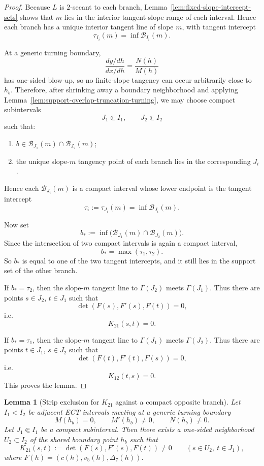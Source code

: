 \documentclass[11pt,a4paper]{amsart}
\theoremstyle{plain}
\newtheorem{lemma}[theorem]{Lemma}
\theoremstyle{definition}
\begin{document}
\begin{proof}
Because $L$ is $2$-secant to each branch, Lemma~\ref{lem:fixed-slope-intercept-sets}
shows that $m$ lies in the interior tangent-slope range of each interval.
Hence each branch has a unique interior tangent line of slope $m$, with tangent
intercept
\[
\tau_{I_i}(m)=\inf \mathcal B_{I_i}(m).
\]

At a generic turning boundary,
\[
\frac{dy/dh}{dx/dh}=\frac{N(h)}{M(h)}
\]
has one-sided blow-up, so no finite-slope tangency can occur arbitrarily close
to $h_b$. Therefore, after shrinking away a boundary neighborhood and applying
Lemma~\ref{lem:support-overlap-truncation-turning}, we may choose compact
subintervals
\[
J_1\Subset I_1,
\qquad
J_2\Subset I_2
\]
such that:
\begin{enumerate}
\item $b\in \mathcal B_{J_1}(m)\cap \mathcal B_{J_2}(m)$;
\item the unique slope-$m$ tangency point of each branch lies in the
corresponding $J_i$.
\end{enumerate}
Hence each $\mathcal B_{J_i}(m)$ is a compact interval whose lower endpoint
is the tangent intercept
\[
\tau_i:=\tau_{J_i}(m)=\inf \mathcal B_{J_i}(m).
\]

Now set
\[
b_*:=\inf\bigl(\mathcal B_{J_1}(m)\cap \mathcal B_{J_2}(m)\bigr).
\]
Since the intersection of two compact intervals is again a compact interval,
\[
b_*=\max(\tau_1,\tau_2).
\]
So $b_*$ is equal to one of the two tangent intercepts, and it still lies in
the support set of the other branch.

If $b_*=\tau_2$, then the slope-$m$ tangent line to $\Gamma(J_2)$ meets
$\Gamma(J_1)$. Thus there are points $s\in J_2$, $t\in J_1$ such that
\[
\det(F(s),F'(s),F(t))=0,
\]
i.e.
\[
K_{21}(s,t)=0.
\]

If $b_*=\tau_1$, then the slope-$m$ tangent line to $\Gamma(J_1)$ meets
$\Gamma(J_2)$. Thus there are points $t\in J_1$, $s\in J_2$ such that
\[
\det(F(t),F'(t),F(s))=0,
\]
i.e.
\[
K_{12}(t,s)=0.
\]
This proves the lemma.
\end{proof}

\begin{lemma}[Strip exclusion for $K_{21}$ against a compact opposite branch]
\label{lem:strip-exclusion-k21}
Let $I_1<I_2$ be adjacent ECT intervals meeting at a generic turning boundary
\[
M(h_b)=0,\qquad M'(h_b)\neq 0,\qquad N(h_b)\neq 0.
\]
Let $J_1\Subset I_1$ be a compact subinterval. Then there exists a one-sided
neighborhood $U_2\subset I_2$ of the shared boundary point $h_b$ such that
\[
K_{21}(s,t):=\det(F(s),F'(s),F(t))\neq 0
\qquad
(s\in U_2,\ t\in J_1),
\]
where $F(h)=(c(h),v_5(h),\Delta_7(h))$.
\end{lemma}
\end{document}

